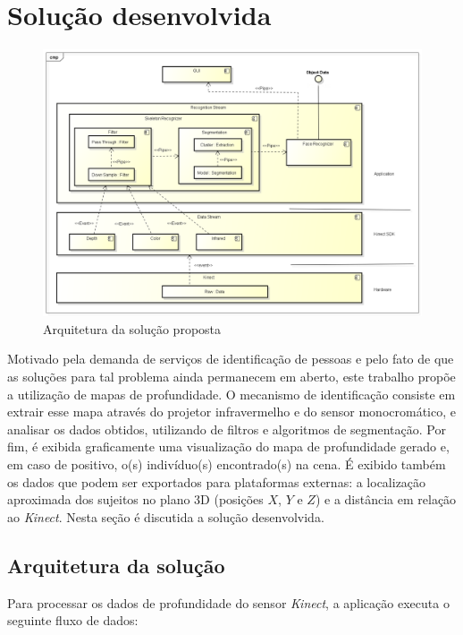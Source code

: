 \section{Solução desenvolvida}\label{sec:solucao-desenvolvida}

\begin{figure}[ht]
\centering
\includegraphics[width=1.0\textwidth]{images/Arquitetura_da_solucao.png}
\caption{Arquitetura da solução proposta}
\label{fig:visao-geral}
\end{figure}

Motivado pela demanda de serviços de identificação de pessoas e pelo fato de que as soluções para tal problema ainda permanecem em aberto, este trabalho propõe a utilização de mapas de profundidade. O mecanismo de identificação consiste em extrair esse mapa através do projetor infravermelho e do sensor monocromático, e analisar os dados obtidos, utilizando de filtros e algoritmos de segmentação. Por fim, é exibida graficamente uma visualização do mapa de profundidade gerado e, em caso de positivo, o(s) indivíduo(s) encontrado(s) na cena. É exibido também os dados que podem ser exportados para plataformas externas: a localização aproximada dos sujeitos no plano 3D (posições $X$, $Y$ e $Z$) e a distância em relação ao \textit{Kinect}. Nesta seção é discutida a solução desenvolvida.

\subsection{Arquitetura da solução}\label{sec:arqSol}
Para processar os dados de profundidade do sensor \textit{Kinect}, a aplicação executa o seguinte fluxo de dados:

